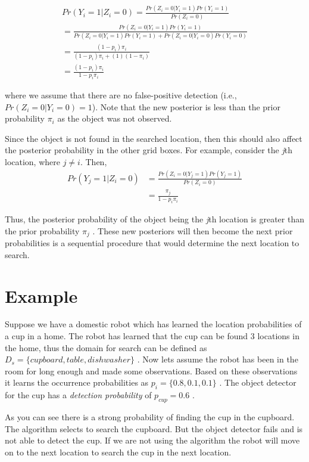 \begin{gather*}
	Pr(Y_i = 1 | Z_i = 0) = \frac{Pr(Z_i = 0|Y_i=1)Pr(Y_i=1)} {Pr(Z_i=0)} \\
	                       = \frac{Pr(Z_i = 0| Y_i =1 )Pr(Y_i =1)}{Pr(Z_i=0|Y_i =1)Pr(Y_i = 1) + Pr(Z_i=0|Y_i=0)Pr(Y_i=0)} \\
	                       = \frac{(1 - p_i)\pi_i}{(1 - p_i)\pi_i + (1)(1 - \pi_i)} \\
	                       = \frac{(1 - p_i)\pi_i}{1 - p_i\pi_i}
\end{gather*}

where we assume that there are no false-positive detection (i.e., $Pr(Z_i =0| Y_i = 0) = 1$). Note that the new posterior is less than the prior probability $\pi_i$ as the object was not observed.

Since the object is not found in the searched location, then this should also affect the posterior probability in the other grid boxes. For example, consider the \emph{j}th location, where $j \neq i$. Then,
\begin{align*}
	Pr(Y_j = 1 | Z_i=0) &= \frac{Pr(Z_i = 0 | Y_j = 1)Pr(Y_j = 1)}{Pr(Z_i = 0)} \\
	                    &= \frac{\pi_j}{ 1 - p_i\pi_i}
\end{align*}

Thus, the posterior probability of the object being the \emph{j}th location is greater than the prior probability $\pi_j$ . These new posteriors will then become the next prior probabilities is a sequential procedure that would determine the next location to search.


\section{Example}

Suppose we have a domestic robot which has learned the location probabilities of a cup in a home. The robot has learned that the cup can be found 3 locations in the home, thus the domain for search can be defined as $D_s = \{cupboard, table, dishwasher \}$ . 
Now lets assume the robot has been in the room for long enough and made some observations. Based on these observations it learns the occurrence probabilities as $p_i = \{ 0.8, 0.1, 0.1\}$ . The object detector for the cup has a \emph{detection probability} of $p_{cup} =  0.6$ .

As you can see there is a strong probability of finding the cup in the cupboard. The algorithm selects to search the cupboard. But the object detector fails and is not able to detect the cup. If we are not using the algorithm the robot will move on to the next location to search the cup in the next location.



